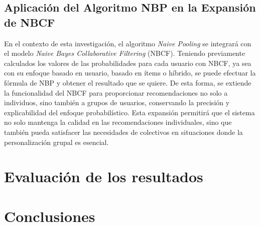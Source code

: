 \documentclass[twocolumn, fontsize=10pt]{article}
\begin{document}
\subsection{Aplicación del Algoritmo NBP en la Expansión de NBCF}

En el contexto de esta investigación, el algoritmo 
\textit{Naive Pooling} se integrará con el modelo 
\textit{Naive Bayes Collaborative Filtering} (NBCF). 
Teniendo previamente calculados los valores de las 
probabilidades para cada usuario con NBCF, ya sea con 
su enfoque basado en usuario, basado en ítems o híbrido,
se puede efectuar la fórmula de NBP y obtener el resultado 
que se quiere. De esta forma, se extiende 
la funcionalidad del NBCF para proporcionar 
recomendaciones no solo a individuos, sino también a 
grupos de usuarios, conservando la precisión y 
explicabilidad del enfoque probabilístico. 
Esta expansión permitirá que el sistema no solo 
mantenga la calidad en las recomendaciones 
individuales, sino que también pueda satisfacer las 
necesidades de colectivos en situaciones donde la 
personalización grupal es esencial.

\section{Evaluación de los resultados}

\section{Conclusiones}

\renewcommand\refname{Referencias}
\end{document}
